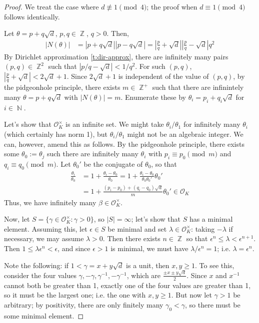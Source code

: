 \documentclass[11pt, a4paper]{memoir}
\DeclareMathOperator{\N}{{\mathbb{N}}}
\DeclareMathOperator{\Z}{{\mathbb{Z}}}
\theoremstyle{change}
\theoremstyle{plain}
\theoremstyle{nonumberplain}
\newtheorem{proof}{Proof}
\numberwithin{equation}{section}
\begin{document}
\begin{proof}
    We treat the case where $d\nequiv 1\pmod{4}$; the proof when $d\equiv 1\pmod{4}$ follows identically.

    Let $\theta=p+q\sqrt{d}$, $p,q\in\Z$, $q>0$.
    Then,
    \begin{align*}
        |N(\theta)| &= |p+q\sqrt{d}||p-q\sqrt{d}| = \left\lvert\frac{p}{q}+\sqrt{d}\right\rvert\left\lvert\frac{p}{q}-\sqrt{d}\right\rvert q^2
    \end{align*}
    By Dirichlet approximation \cref{t:dir-approx}, there are infinitely many pairs $(p,q)\in\Z^2$ such that $|p/q-\sqrt{d}|<1/q^2$.
    For such $(p,q)$, $\left\lvert\frac{p}{q}+\sqrt{d}\right\rvert<2\sqrt{d}+1$.
    Since $2\sqrt{d}+1$ is independent of the value of $(p,q)$, by the pidgeonhole principle, there exists $m\in\Z^+$ such that there are infinintely many $\theta=p+q\sqrt{d}$ with $|N(\theta)|=m$.
    Enumerate these by $\theta_i=p_i+q_i\sqrt{d}$ for $i\in\N$.

    Let's show that $\mathcal{O}_K^\times$ is an infinite set.
    We might take $\theta_i/\theta_1$ for infinitely many $\theta_i$ (which certainly has norm 1), but $\theta_i/\theta_1$ might not be an algebraic integer.
    We can, however, amend this as follows.
    By the pidgeonhole principle, there exists some $\theta_0:=\theta_j$ such there are infinitely many $\theta_i$ with $p_i\equiv p_0\pmod{m}$ and $q_i\equiv q_0\pmod{m}$.
    Let $\theta_0'$ be the conjugate of $\theta_0$, so that
    \begin{align*}
        \frac{\theta_i}{\theta_0} &= 1+\frac{\theta_i-\theta_0}{\theta_0}= 1+\frac{\theta_i-\theta_0}{\theta_0\theta_0'}\theta_0'\\
                                  &= 1+\frac{(p_i-p_0)+(q_i-q_0)\sqrt{d}}{m}\theta_0'\in\mathcal{O}_K
    \end{align*}
    Thus, we have infinitely many $\beta\in\mathcal{O}_K^\times$.

    Now, let $S=\{\gamma\in\mathcal{O}_K^\times:\gamma>0\}$, so $|S|=\infty$; let's show that $S$ has a minimal element.
    Assuming this, let $\epsilon\in S$ be minimal and set $\lambda\in\mathcal{O}_K^\times$: taking $-\lambda$ if necessary, we may assume $\lambda>0$.
    Then there exists $n\in\Z$ so that $\epsilon^n\leq\lambda<\epsilon^{n+1}$.
    Then $1\leq\lambda\epsilon^n<\epsilon$, and since $\epsilon>1$ is minimal, we must have $\lambda/\epsilon^n=1$; i.e. $\lambda=\epsilon^n$.

    Note the following: if $1<\gamma=x+y\sqrt{d}$ is a unit, then $x,y\geq 1$.
    To see this, consider the four values $\gamma,-\gamma,\gamma^{-1},-\gamma^{-1}$, which are $\frac{\pm x\pm y\sqrt{d}}{2}$.
    Since $x$ and $x^{-1}$ cannot both be greater than 1, exactly one of the four values are greater than 1, so it must be the largest one; i.e. the one with $x,y\geq 1$.
    But now let $\gamma>1$ be arbitrary; by positivity, there are only finitely many $\gamma_0<\gamma$, so there must be some minimal element.
\end{proof}
\end{document}
